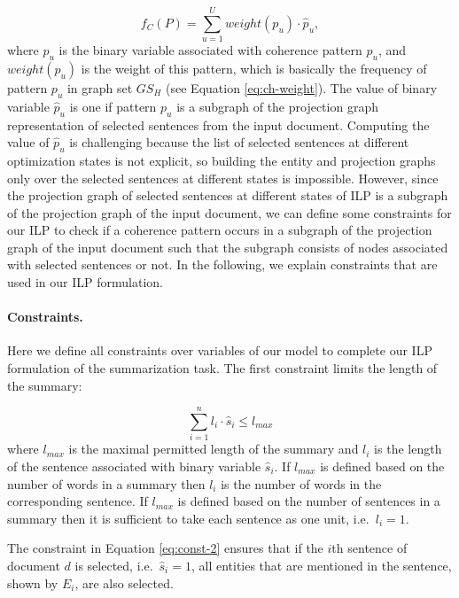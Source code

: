 \begin{equation}
f_C(P) = \sum_{u=1}^{U}{weight(p_u) \cdot \hat{p}_u},
\end{equation}
where $\hat{p}_u$ is the binary variable associated with coherence pattern $p_u$, and $weight(p_u)$ is the weight of this pattern, which is basically the frequency of pattern $p_u$ in graph set $GS_H$ (see Equation \ref{eq:ch-weight}). 
The value of binary variable $\hat{p}_u$ is one if pattern $p_u$ is a subgraph of the projection graph representation of selected sentences from the input document.  
Computing the value of $\hat{p}_u$ is challenging because the list of selected sentences at different optimization states is not explicit, so building the entity and projection graphs only over the selected sentences at different states is impossible. 
However, since the projection graph of selected sentences at different states of ILP is a subgraph of the projection graph of the input document, we can define some constraints for our ILP to check if a coherence pattern occurs in a subgraph of the projection graph of the input document such that the subgraph consists of nodes associated with selected sentences or not. 
In the following, we explain constraints that are used in our ILP formulation. 

\paragraph{Constraints.}
Here we define all constraints over variables of our model to complete our ILP formulation of the summarization task. 
The first constraint limits the length of the summary:

\begin{equation}
\sum_{i=1}^{n} l_i \cdot \hat{s}_i \le l_{max}
\end{equation}
where $l_{max}$ is the maximal permitted length of the summary and $l_i$ is the length of the sentence associated with binary variable $\hat{s}_i$.  
If $l_{max}$ is defined based on the number of words in a summary then $l_i$ is the number of words in the corresponding sentence.  
If $l_{max}$ is defined based on the number of sentences in a summary then it is sufficient to take each sentence as one unit, i.e.\ $l_i=1$. 

The constraint in Equation \ref{eq:const-2} ensures that if the $i$th sentence of document $d$ is selected, i.e.\ $\hat{s}_i = 1$, all entities that are mentioned in the sentence, shown by $E_i$, are also selected. 

